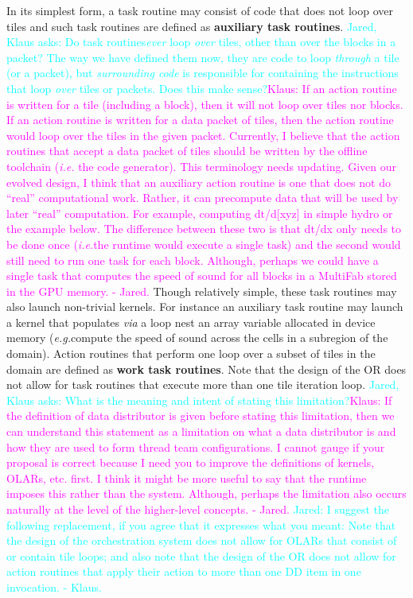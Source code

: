 \documentclass{article}
\newcommand{\ie}{\textit{i.e.}}   %
\newcommand{\eg}{\textit{e.g.}}   %
\newcommand{\JaredQfromKW}[1]   {\textcolor{cyan}{Jared, Klaus asks: #1}}
\newcommand{\JaredRfromKW}[1]   {\textcolor{cyan}{Jared: #1 - Klaus.}}
\newcommand{\KlausRfromJO}[1]   {\textcolor{magenta}{Klaus: #1 - Jared.}}
\newcommand{\shortOLARs} {OLARs\xspace}
\newcommand{\shortOR}   {OR\xspace}
\newcommand{\OLARs}  {\shortOLARs}             %
\newcommand{\OR}        {\shortOR}
\newcommand{\tileloops}              {tile loops\xspace}       %
\newcommand{\taskroutine}        {task routine\xspace}
\newcommand{\taskroutines}       {task routines\xspace}
\newcommand{\actionroutines}       {action routines\xspace}
\begin{document}
In its simplest form, a \taskroutine may consist of code that does
not loop over tiles and such \taskroutines are defined as \textbf{auxiliary
\taskroutines}.
\JaredQfromKW{Do \taskroutines \emph{ever} loop \emph{over} tiles,
other than over the blocks in a packet?
The way we have defined them now, they are code to loop \emph{through} a tile
(or a packet), but \emph{surrounding code} is responsible for containing
the instructions that loop \emph{over} tiles or packets. Does this make
sense?}\KlausRfromJO{If an action routine is written for a tile (including a
block), then it will not loop over tiles nor blocks.  If an action routine is
written for a data packet of tiles, then the action routine would loop over the
tiles in the given packet.  Currently, I believe that the action routines that
accept a data packet of tiles should be written by the offline toolchain (\ie
the code generator).  This terminology needs updating.  Given our evolved
design, I think that an auxiliary action routine is one that does not do
``real'' computational work.  Rather, it can precompute data that will be used
by later ``real'' computation.  For example, computing dt/d[xyz] in simple hydro
or the example below.  The difference between these two is that dt/dx only
needs to be done once (\ie the runtime would execute a single task) and the
second would still need to run one task for each block.  Although, perhaps we
could have a single task that computes the speed of sound for all blocks in a
MultiFab stored in the GPU memory.}
  Though relatively simple, these \taskroutines may also launch
non-trivial kernels.  For instance an auxiliary \taskroutine may launch a kernel that
populates \textit{via} a loop nest an array variable allocated in device memory
(\eg compute the speed of sound across the cells in a subregion of the
domain).  Action routines that perform one loop over a subset of tiles in the domain are
defined as \textbf{work \taskroutines}.  Note that the design of the \OR does not
allow for task routines that execute more than one tile iteration loop.
\JaredQfromKW{What is the meaning and intent of stating this
limitation?}\KlausRfromJO{If the definition of data distributor is given before
stating this limitation, then we can understand this statement as a limitation
on what a data distributor is and how they are used to form thread team
configurations.  I
cannot gauge if your proposal is correct because I need you to improve the
definitions of kernels, OLARs, etc. first.  I think it might be more useful to
say that the runtime imposes this rather than the system.  Although, perhaps the
limitation also occurs naturally at the level of the higher-level concepts.}
\JaredRfromKW{I suggest the following replacement, if you agree that it
expresses what you meant: Note that the design of the orchestration system does not
allow for \OLARs that consist of or contain \tileloops; and also
note that the design of the \OR does not
allow for \actionroutines that apply their action to more than one DD item
in one invocation.
}\\
\end{document}
